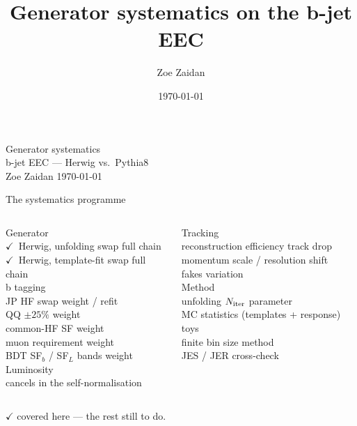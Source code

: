\documentclass[aspectratio=169,11pt]{beamer}
\title{\normalsize Generator systematics on the b-jet EEC}
\author{\footnotesize Zoe Zaidan}
\date{\footnotesize\today}
\begin{document}
{
\begin{frame}
\vfill
{\LARGE\color{slate} Generator systematics}\\[0.4em]
{\large\color{ink} b-jet EEC --- Herwig vs.\ Pythia8}\\[2em]
{\footnotesize\color{gray} Zoe Zaidan \quad\textbullet\quad \today}
\vfill
\end{frame}}

\begin{frame}{The systematics programme}
\vspace{0.3em}
{\footnotesize
\begin{columns}[t]
\textcolor{slate}{Generator}\\[0.35em]
\textcolor{sage}{$\checkmark$}~Herwig, unfolding swap \hfill {\color{gray}full chain}\\
\textcolor{sage}{$\checkmark$}~Herwig, template-fit swap \hfill {\color{gray}full chain}\\[1.1em]
\textcolor{slate}{b tagging}\\[0.35em]
JP HF swap \hfill {\color{gray}weight / refit}\\
QQ $\pm25\%$ \hfill {\color{gray}weight}\\
common-HF SF \hfill {\color{gray}weight}\\
muon requirement \hfill {\color{gray}weight}\\
BDT SF$_b$ / SF$_L$ bands \hfill {\color{gray}weight}\\[1.1em]
\textcolor{slate}{Luminosity}\\[0.35em]
{\color{gray}cancels in the self-normalisation}

\textcolor{slate}{Tracking}\\[0.35em]
reconstruction efficiency \hfill {\color{gray}track drop}\\
momentum scale / resolution \hfill {\color{gray}shift}\\
fakes \hfill {\color{gray}variation}\\[1.1em]
\textcolor{slate}{Method}\\[0.35em]
unfolding $N_{\rm iter}$ \hfill {\color{gray}parameter}\\
MC statistics (templates + response) \hfill {\color{gray}toys}\\
finite bin size \hfill {\color{gray}method}\\
JES / JER \hfill {\color{gray}cross-check}
\end{columns}
}
\vspace{1em}
{\small \textcolor{sage}{$\checkmark$} covered here --- the rest still to do.}
\end{frame}
\end{document}
